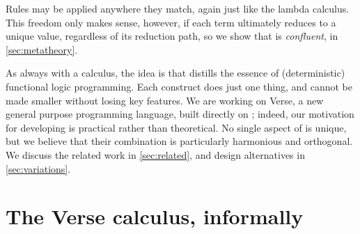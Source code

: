 \documentclass[acmsmall]{acmart}
\begin{document}
%
Rules may be applied anywhere they match, again just like the lambda calculus.
This freedom only makes sense, however, if each term ultimately reduces to a unique value,
regardless of its reduction path,
so we show that \versecalc{} is \emph{confluent}, in \cref{sec:metatheory}.

As always with a calculus, the idea is that \versecalc{} distills the essence of
(deterministic) functional logic programming.
Each construct does just one thing, and \versecalc{} cannot be made smaller without losing key features.
We are working on Verse, a new general purpose programming language, built directly on \versecalc{}; indeed,
our motivation for developing \versecalc{} is practical rather than theoretical.
No single aspect of \versecalc{} is unique, but we believe that their combination
is particularly harmonious and orthogonal.
We discuss the related work in \cref{sec:related}, and design alternatives in \cref{sec:variations}.



\section{The Verse calculus, informally} \label{sec:informal}

\figureSyntax
\end{document}
